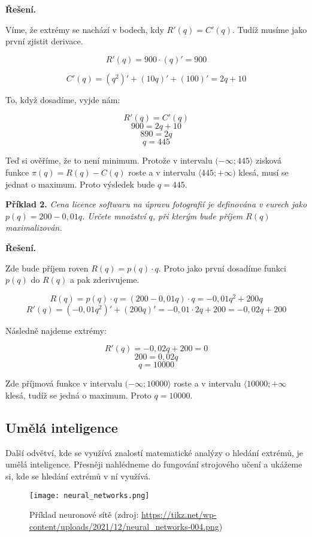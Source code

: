 \documentclass{fkssolpub}
\begin{document}
\textbf{Řešení.}

Víme, že extrémy se nachází v bodech, kdy $R'(q) = C'(q)$. Tudíž musíme
jako první zjistit derivace.

\[
  R'(q) = 900 \cdot (q)' = 900
\]

\[
  C'(q) = (q^2)' + (10q)' + (100)' = 2q + 10
\]

To, když dosadíme, vyjde nám:

\[
  R'(q) = C'(q)
\]
\[
  900 = 2q + 10
\]
\[
  890 = 2q
\]
\[
  q = 445
\]

Teď si ověříme, že to není minimum. Protože v intervalu 
$(-\infty; 445 \rangle$ zisková funkce $\pi(q) = R(q) - C(q)$ roste a 
v intervalu $\langle 445; +\infty)$ klesá, musí se jednat o maximum. 
Proto výsledek bude $q = 445$.

\textbf{Příklad 2.}
\textit{Cena licence softwaru na úpravu fotografií je definována
v eurech jako $p(q) = 200 - 0,01q$. Určete množství $q$, při kterým bude 
příjem $R(q)$ maximalizován.}

\textbf{Řešení.}

Zde bude příjem roven $R(q) = p(q) \cdot q$. Proto jako první dosadíme
funkci $p(q)$ do $R(q)$ a pak zderivujeme.

\[
  R(q) = p(q) \cdot q = (200 - 0,01q) \cdot q = -0,01q^2 + 200q
\]
\[
  R'(q) = (-0,01q^2)' + (200q)' = -0,01 \cdot 2q + 200 = -0,02q + 200
\]

Následně najdeme extrémy:

\[
  R'(q) = -0,02q + 200 = 0
\]
\[
  200 = 0,02q
\]
\[
  q = 10000
\]

Zde příjmová funkce v intervalu $(-\infty; 10000 \rangle$ roste a v 
intervalu $\langle 10000; +\infty$ klesá, tudíž se jedná o maximum. 
Proto $q = 10000$.

\subsection{Umělá inteligence}

Další odvětví, kde se využívá znalostí matematické analýzy o hledání
extrémů, je umělá inteligence. Přesněji nahlédneme do fungování strojového
učení a ukážeme si, kde se hledání extrémů v ní využívá.

\begin{figure}[h!]
  \centering
  \texttt{[image: neural\_networks.png]}
  \caption{
    Příklad neuronové sítě (zdroj: 
    \url{https://tikz.net/wp-content/uploads/2021/12/neural_networks-004.png})
  }
  \label{fig:network}
\end{figure}
\end{document}
